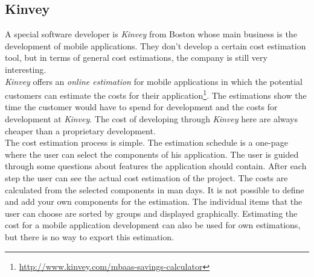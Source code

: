 \subsection{Kinvey}

A special software developer is \textit{Kinvey} from Boston whose main business is the development of mobile applications. They don't develop a certain cost estimation tool, but in terms of general cost estimations, the company is still very interesting.
\\
\textit{Kinvey} offers an \textit{online estimation} for mobile applications in which the potential customers can estimate the costs for their application\footnote{\url{http://www.kinvey.com/mbaas-savings-calculator}}. The estimations show the time the customer would have to spend for development and the costs for development at \textit{Kinvey}. The cost of developing through \textit{Kinvey} here are always cheaper than a proprietary development.
\\
The cost estimation process is simple. The estimation schedule is a one-page where the user can select the components of his application. The user is guided through some questions about features the application should contain. After each step the user can see the actual cost estimation of the project.
The costs are calculated from the selected components in man days. It is not possible to define and add your own components for the estimation. The individual items that the user can choose are sorted by groups and displayed graphically. Estimating the cost for a mobile application development can also be used for own estimations, but there is no way to export this estimation.
